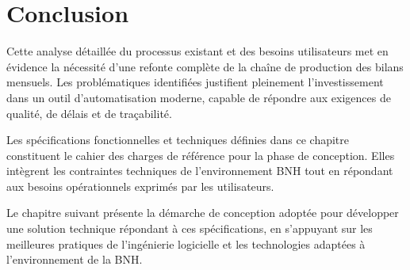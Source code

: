 \section{Conclusion}

Cette analyse détaillée du processus existant et des besoins utilisateurs met en évidence la nécessité d'une refonte complète de la chaîne de production des bilans mensuels. Les problématiques identifiées justifient pleinement l'investissement dans un outil d'automatisation moderne, capable de répondre aux exigences de qualité, de délais et de traçabilité.

\medskip

Les spécifications fonctionnelles et techniques définies dans ce chapitre constituent le cahier des charges de référence pour la phase de conception. Elles intègrent les contraintes techniques de l'environnement BNH tout en répondant aux besoins opérationnels exprimés par les utilisateurs.

\medskip

Le chapitre suivant présente la démarche de conception adoptée pour développer une solution technique répondant à ces spécifications, en s'appuyant sur les meilleures pratiques de l'ingénierie logicielle et les technologies adaptées à l'environnement de la BNH.